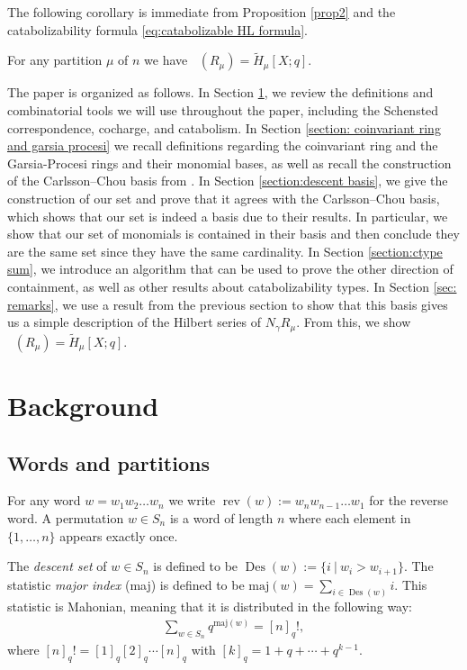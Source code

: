 \documentclass[10pt]{amsart}
\theoremstyle{plain}
\theoremstyle{definition}
\theoremstyle{plain}
\theoremstyle{plain}
\theoremstyle{remark}
\theoremstyle{plain}
\theoremstyle{plain}
\DeclareMathOperator{\Frob}{Frob}
\DeclareMathOperator{\rev}{rev}
\DeclareMathOperator{\des}{Des}
\DeclareMathOperator{\Frobq}{\Frob_q}
\newcommand{\mHL}{\tilde{H}}
\begin{document}
The following corollary is immediate from Proposition \ref{prop2}  and the catabolizability formula \eqref{eq:catabolizable HL formula}.
\begin{cor3}
For any partition $\mu$ of $n$ we have $\Frobq(R_{\mu}) =\mHL_{\mu}[X;q].$
\end{cor3}

The paper is organized as follows. 
In Section \ref{section:background}, we review the definitions and  combinatorial tools we will use throughout the paper, including the Schensted correspondence, cocharge, and catabolism. 
In Section \ref{section: coinvariant ring and garsia procesi} we recall definitions regarding the coinvariant ring and the Garsia-Procesi rings and their monomial bases, as well as recall the construction of the Carlsson--Chou basis from \cite{CC}.
In Section \ref{section:descent basis}, we give the construction of our set and prove that it agrees with the Carlsson--Chou basis, which shows that our set is indeed a basis due to their results. In particular, we show that our set of monomials is contained in their basis and then conclude they are the same set since they have the same cardinality.
In Section \ref{section:ctype sum}, we introduce an algorithm that can be used to prove the other direction of containment, as well as other results about catabolizability types. 
In Section \ref{sec: remarks}, we use a result from the previous section to show that this basis gives us a simple description of the Hilbert series of $N_\gamma R_{\mu}$. From this, we show $\Frobq(R_{\mu})=\mHL_{\mu}[X;q]$.

\section{Background}\label{section:background}
\subsection{Words and partitions} \label{subsec: words and parts}
For any word $w =  w_1w_2\dots w_n$ we write  $\rev(w) := w_n w_{n-1}\dots w_1$ for the reverse word.  A permutation $w\in S_n$ is a word of length $n$ where each element in $\{1,\dots, n\}$ appears exactly once.

The \textit{descent set} of $w\in S_n$ is defined to be $\des (w) := \{i \ | \ w_i > w_{i+1}\}.$
The statistic \textit{major index} (maj) is defined to be
$\text{maj}(w) = \sum_{i \in \des(w)} i.$
This statistic is Mahonian, meaning that it is distributed in the following way:
\begin{align*}
  \sum\limits_{w\in S_n} q^{\text{maj}(w)} = [n]_q!,
\end{align*}
where $[n]_q! = [1]_q[2]_q\cdots [n]_q$ with $[k]_q = 1 + q+\cdots + q^{k-1}$.
\end{document}
